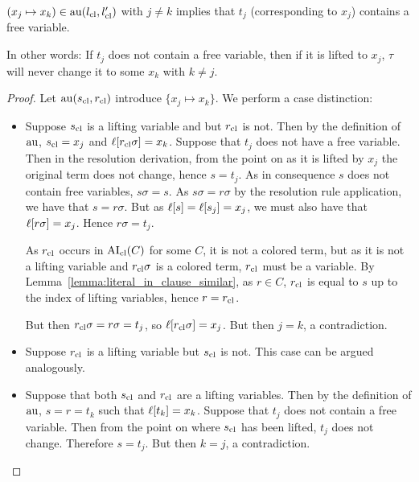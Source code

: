 \documentclass[,%
	paper=a4,%
	DIV12, %
	twoside=false,%
	liststotoc,
	bibtotoc,
	draft=false,%
	numbers=noendperiod
]{scrartcl}
\begin{document}
\begin{lemma}
	\label{lemma:tau_only_for_variable_terms}
	$(x_j \mapsto x_k) \in \operatorname{au}(l_\mathrm{cl}, l_\mathrm{cl}')$ with $j\neq k$ implies that $t_j$ (corresponding to $x_j$) contains a free variable.

	In other words: If $t_j$ does not contain a free variable, then if it is lifted to $x_j$, $\tau$ will never change it to some $x_k$ with $k\neq j$.
\end{lemma}
\begin{proof}
	Let  $\operatorname{au}(s_\mathrm{cl}, r_\mathrm{cl})$ introduce $\{x_j \mapsto x_k\}$.
	We perform a case distinction:
	\begin{itemize}
		\item Suppose $s_\mathrm{cl}$ is a lifting variable and but $r_\mathrm{cl}$ is not.
			Then by the definition of $\operatorname{au}$, $s_\mathrm{cl} = x_j$ and $\ell[r_\mathrm{cl}\sigma] = x_k$.
			Suppose that $t_j$ does not have a free variable.
			Then in the resolution derivation, from the point on as it is lifted by $x_j$ the original term does not change, hence $s = t_j$. As in consequence $s$ does not contain free variables, $s\sigma = s$.
			As $s\sigma = r\sigma$ by the resolution rule application, we have that $s = r\sigma$.
			But as $\ell[s] = \ell[s_j] = x_j$, we must also have that $\ell[r\sigma] = x_j$.
			Hence $r\sigma = t_j$.

			As $r_\mathrm{cl}$ occurs in $\operatorname{AI}_\mathrm{cl}(C)$ for some $C$, it is not a colored term, but as it is not a lifting variable and $r_\mathrm{cl}\sigma$ is a colored term, $r_\mathrm{cl}$ must be a variable.
			By Lemma~\ref{lemma:literal_in_clause_similar}, as $r \in C$, $r_\mathrm{cl}$ is equal to $s$ up to the index of lifting variables, hence $r = r_\mathrm{cl}$.

			But then $r_\mathrm{cl}\sigma = r\sigma = t_j$, so $\ell[r_\mathrm{cl}\sigma] = x_j$. But then $j=k$, a contradiction.

		\item Suppose $r_\mathrm{cl}$ is a lifting variable but $s_\mathrm{cl}$ is not. This case can be argued analogously.

		\item Suppose that both $s_\mathrm{cl}$ and $r_\mathrm{cl}$ are a lifting variables.
			Then by the definition of $\operatorname{au}$, $s = r = t_k$ such that $\ell[t_k] = x_k$.
			Suppose that $t_j$ does not contain a free variable. Then from the point on where $s_\mathrm{cl}$ has been lifted, $t_j$ does not change. Therefore $s = t_j$. But then $k=j$, a contradiction.
			\qedhere
	\end{itemize}
\end{proof}
\end{document}
